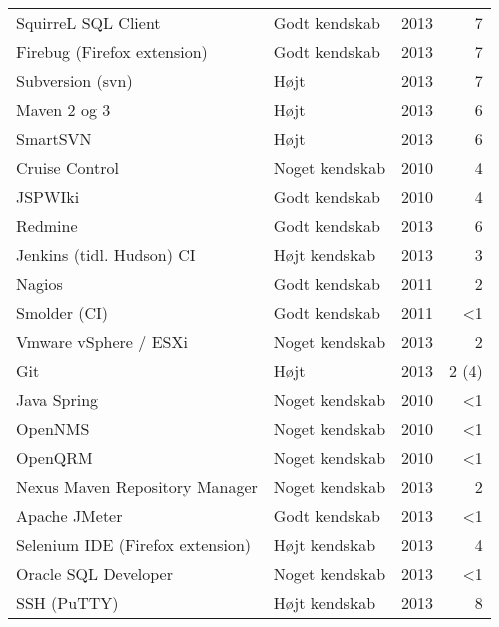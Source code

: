 \documentclass[a4paper,11pt]{article}
\begin{document}
\begin{tabularx}{\textwidth}{X l r r}
  SquirreL SQL Client                     & Godt kendskab   & 2013                  &      7 \\
  Firebug (Firefox extension)             & Godt kendskab   & 2013                  &      7 \\
  Subversion (svn)                        & Højt            & 2013                  &      7 \\
  Maven 2 og 3                            & Højt            & 2013                  &      6 \\
  SmartSVN                                & Højt            & 2013                  &      6 \\
  Cruise Control                          & Noget kendskab  & 2010                  &      4 \\
  JSPWIki                                 & Godt kendskab   & 2010                  &      4 \\
  Redmine                                 & Godt kendskab   & 2013                  &      6 \\
  Jenkins (tidl. Hudson) CI               & Højt kendskab   & 2013                  &      3 \\
  Nagios                                  & Godt kendskab   & 2011                  &      2 \\
  Smolder (CI)                            & Godt kendskab   & 2011                  &     \textless1 \\
  Vmware vSphere / ESXi                   & Noget kendskab  & 2013                  &      2 \\
  Git                                     & Højt            & 2013                  &   2 (4)\\
  Java Spring                             & Noget kendskab  & 2010                  &     \textless1 \\
  OpenNMS                                 & Noget kendskab  & 2010                  &     \textless1 \\
  OpenQRM                                 & Noget kendskab  & 2010                  &     \textless1 \\
  Nexus Maven Repository Manager          & Noget kendskab  & 2013                  &      2 \\
  Apache JMeter                           & Godt kendskab   & 2013                  &     \textless1 \\
  Selenium IDE (Firefox extension)        & Højt kendskab   & 2013                  &      4 \\
  Oracle SQL Developer                    & Noget kendskab  & 2013                  &     \textless1 \\
  SSH (PuTTY)                             & Højt kendskab   & 2013                  &      8 \\
  \hline
\end{tabularx}

\end{document}
